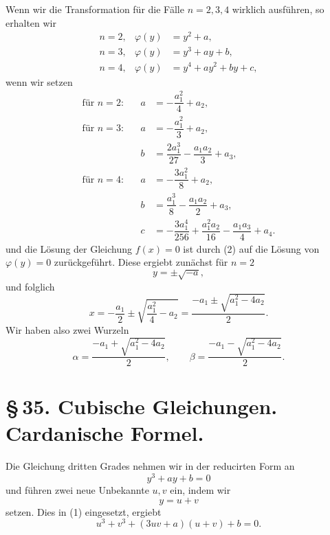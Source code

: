 \documentclass[11pt]{article}
\begin{document}
Wenn wir die Transformation für die Fälle $n=2,3,4$ wirklich ausführen, so erhalten wir
\begin{equation}
\begin{array}{rcl}
n=2, & \varphi(y)&=y^2+a,\\[0.25em]
n=3, & \varphi(y)&=y^3+ay+b,\\[0.25em]
n=4, & \varphi(y)&=y^4+ay^2+by+c,
\end{array}
\tag{3}
\end{equation}
wenn wir setzen
\begin{equation}
\begin{array}{rcll}
\text{für }n=2:&& a&=-\dfrac{a_1^2}{4}+a_2,\\[0.75em]
\text{für }n=3:&& a&=-\dfrac{a_1^2}{3}+a_2,\\[0.75em]
&& b&=\dfrac{2a_1^3}{27}-\dfrac{a_1a_2}{3}+a_3,\\[0.75em]
\text{für }n=4:&& a&=-\dfrac{3a_1^2}{8}+a_2,\\[0.75em]
&& b&=\dfrac{a_1^3}{8}-\dfrac{a_1a_2}{2}+a_3,\\[0.75em]
&& c&=-\dfrac{3a_1^4}{256}+\dfrac{a_1^2a_2}{16}-\dfrac{a_1a_3}{4}+a_4.
\end{array}
\tag{4}
\end{equation}
und die Lösung der Gleichung $f(x)=0$ ist durch (2) auf die Lösung von $\varphi(y)=0$ zurückgeführt. Diese ergiebt zunächst für $n=2$
\[
 y=\pm\sqrt{-a},
\]
und folglich
\[
 x=-\frac{a_1}{2}\pm\sqrt{\frac{a_1^2}{4}-a_2}
   =\frac{-a_1\pm\sqrt{a_1^2-4a_2}}{2}.
\]
Wir haben also zwei Wurzeln
\begin{equation}
\alpha=\frac{-a_1+\sqrt{a_1^2-4a_2}}{2},\qquad
\beta =\frac{-a_1-\sqrt{a_1^2-4a_2}}{2}.
\tag{5}
\end{equation}

\section*{\S\,35. Cubische Gleichungen. Cardanische Formel.}

Die Gleichung dritten Grades nehmen wir in der reducirten Form an
\begin{equation}
y^3+ay+b=0
\tag{1}
\end{equation}
und führen zwei neue Unbekannte $u,v$ ein, indem wir
\begin{equation}
y=u+v
\tag{2}
\end{equation}
setzen. Dies in (1) eingesetzt, ergiebt
\begin{equation}
u^3+v^3+(3uv+a)(u+v)+b=0.
\tag{3}
\end{equation}
\end{document}
